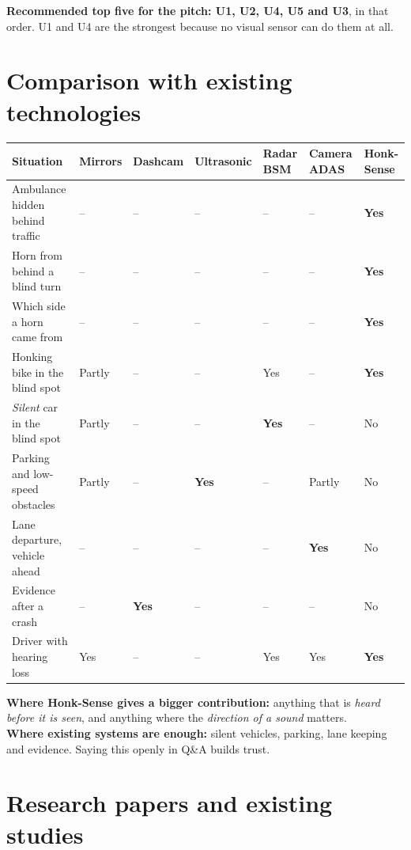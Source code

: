 \documentclass[11pt]{article}
\begin{document}
\textbf{Recommended top five for the pitch: U1, U2, U4, U5 and U3}, in that order. U1 and U4 are the strongest because no visual sensor can do them at all.

\section{Comparison with existing technologies}
{\small\renewcommand{\arraystretch}{1.25}
\setlength{\tabcolsep}{4pt}\begin{tabularx}{\textwidth}{@{}XC{1.4cm}C{1.6cm}C{1.85cm}C{1.4cm}C{1.4cm}C{1.5cm}@{}}
\toprule
\textbf{Situation} & \textbf{Mirrors} & \textbf{Dashcam} & \textbf{Ultrasonic} & \textbf{Radar BSM} & \textbf{Camera ADAS} & \textbf{Honk-Sense} \\
\midrule
Ambulance hidden behind traffic & -- & -- & -- & -- & -- & \textbf{Yes} \\
Horn from behind a blind turn & -- & -- & -- & -- & -- & \textbf{Yes} \\
Which side a horn came from & -- & -- & -- & -- & -- & \textbf{Yes} \\
Honking bike in the blind spot & Partly & -- & -- & Yes & -- & \textbf{Yes} \\
\emph{Silent} car in the blind spot & Partly & -- & -- & \textbf{Yes} & -- & No \\
Parking and low-speed obstacles & Partly & -- & \textbf{Yes} & -- & Partly & No \\
Lane departure, vehicle ahead & -- & -- & -- & -- & \textbf{Yes} & No \\
Evidence after a crash & -- & \textbf{Yes} & -- & -- & -- & No \\
Driver with hearing loss & Yes & -- & -- & Yes & Yes & \textbf{Yes} \\
\bottomrule
\end{tabularx}}

\textbf{Where Honk-Sense gives a bigger contribution:} anything that is \emph{heard before it is seen}, and anything where the \emph{direction of a sound} matters.\\
\textbf{Where existing systems are enough:} silent vehicles, parking, lane keeping and evidence. Saying this openly in Q\&A builds trust.

\section{Research papers and existing studies}
\end{document}
